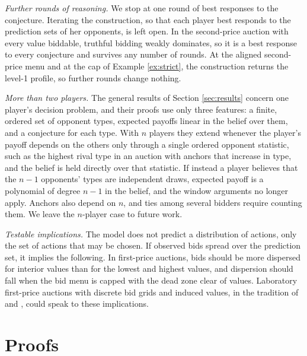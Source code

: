 \documentclass[12pt]{article}
\theoremstyle{definition}
\begin{document}
\emph{Further rounds of reasoning.} We stop at one round of best responses to the conjecture. Iterating the construction, so that each player best responds to the prediction sets of her opponents, is left open. In the second-price auction with every value biddable, truthful bidding weakly dominates, so it is a best response to every conjecture and survives any number of rounds. At the aligned second-price menu and at the cap of Example \ref{ex:strict}, the construction returns the level-1 profile, so further rounds change nothing.

\emph{More than two players.} The general results of Section \ref{sec:results} concern one player's decision problem, and their proofs use only three features: a finite, ordered set of opponent types, expected payoffs linear in the belief over them, and a conjecture for each type. With $n$ players they extend whenever the player's payoff depends on the others only through a single ordered opponent statistic, such as the highest rival type in an auction with anchors that increase in type, and the belief is held directly over that statistic. If instead a player believes that the $n-1$ opponents' types are independent draws, expected payoff is a polynomial of degree $n - 1$ in the belief, and the window arguments no longer apply. Anchors also depend on $n$, and ties among several bidders require counting them. We leave the $n$-player case to future work.

\emph{Testable implications.} The model does not predict a distribution of actions, only the set of actions that may be chosen. If observed bids spread over the prediction set, it implies the following. In first-price auctions, bids should be more dispersed for interior values than for the lowest and highest values, and dispersion should fall when the bid menu is capped with the dead zone clear of values. Laboratory first-price auctions with discrete bid grids and induced values, in the tradition of \citet{kagel1987} and \citet{kagel1993independent}, could speak to these implications.

\appendix

\section{Proofs}\label{app:proofs}
\end{document}
